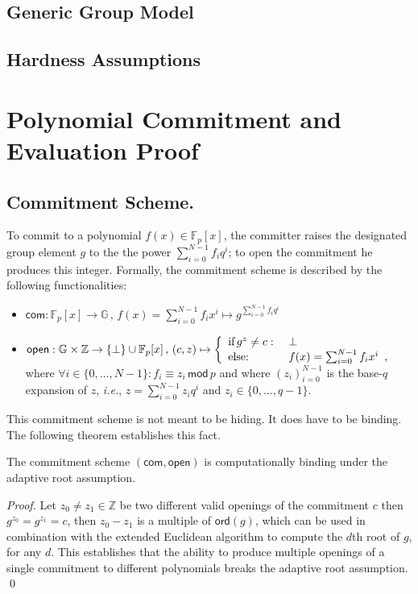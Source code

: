 \documentclass[10pt]{llncs}
\begin{document}
\subsection{Generic Group Model}

\subsection{Hardness Assumptions}

\section{Polynomial Commitment and Evaluation Proof}

\subsection{Commitment Scheme.}
To commit to a polynomial $f(x) \in \mathbb{F}_p[x]$, the committer raises the designated group element $g$ to the the power $\sum_{i=0}^{N-1} f_iq^i$; to open the commitment he produces this integer. Formally, the commitment scheme is described by the following functionalities:
\begin{itemize}
\item $\mathsf{com} : \mathbb{F}_p[x] \rightarrow \mathbb{G} \, , \, f(x) = \sum_{i=0}^{N-1} f_i x^i \mapsto g^{\sum_{i=0}^{N-1} f_i q^i}$
\item $\mathsf{open} : \mathbb{G} \times \mathbb{Z} \rightarrow \{ \bot \} \cup \mathbb{F}_p[x] \, , \, (c, z) \mapsto \left\lbrace \begin{array}{ll}
\textnormal{if} \, g^z \neq c: \, & \, \bot \\
\textnormal{else:} \, & \, f(x) = \sum_{i=0}^{N-1} f_ix^i \enspace ,
\end{array} \right.$ 
where $\forall i \in \{0, \ldots, N-1\} : f_i \equiv z_i \, \mathsf{mod} \, p$ and where $(z_i)_{i=0}^{N-1}$ is the base-$q$ expansion of $z$, \emph{i.e.}, $z = \sum_{i=0}^{N-1} z_iq^i$ and $z_i \in \{0,\ldots, q-1\}$.
\end{itemize}
This commitment scheme is not meant to be hiding. It does have to be binding. The following theorem establishes this fact.

\begin{theorem}[binding]
The commitment scheme $(\mathsf{com}, \mathsf{open})$ is computationally binding under the adaptive root assumption.
\end{theorem}
\begin{proof}
Let $z_0 \neq z_1 \in \mathbb{Z}$ be two different valid openings of the commitment $c$ then $g^{z_0} = g^{z_1} = c$, then $z_0 - z_1$ is a multiple of $\mathsf{ord}(g)$, which can be used in combination with the extended Euclidean algorithm to compute the $d$th root of $g$, for any $d$. This establishes that the ability to produce multiple openings of a single commitment to different polynomials breaks the adaptive root assumption. \qed
\end{proof}
\end{document}
